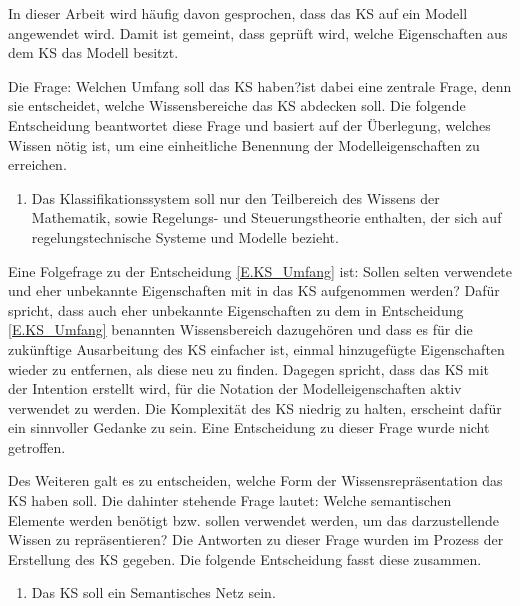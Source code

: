 In dieser Arbeit wird häufig davon gesprochen, dass das KS auf ein Modell angewendet wird. Damit ist gemeint, dass geprüft wird, welche Eigenschaften aus dem KS das Modell besitzt. 

Die Frage: \glqq Welchen Umfang soll das KS haben?\grqq ist dabei eine zentrale Frage, denn sie entscheidet, welche Wissensbereiche das KS abdecken soll. Die folgende Entscheidung beantwortet diese Frage und basiert auf der Überlegung, welches Wissen nötig ist, um eine einheitliche Benennung der Modelleigenschaften zu erreichen. 
\begin{enumerate}[resume*]
	\item \label{E.KS_Umfang}Das Klassifikationssystem soll nur den Teilbereich des Wissens der Mathematik, sowie Regelungs- und Steuerungstheorie enthalten, der sich auf regelungstechnische Systeme und Modelle bezieht.
\end{enumerate}

Eine Folgefrage zu der Entscheidung \ref{E.KS_Umfang} ist: Sollen selten verwendete und eher unbekannte Eigenschaften mit in das KS aufgenommen werden? Dafür spricht, dass auch eher unbekannte Eigenschaften zu dem in Entscheidung \ref{E.KS_Umfang} benannten Wissensbereich dazugehören und dass es für die zukünftige Ausarbeitung des KS einfacher ist, einmal hinzugefügte Eigenschaften wieder zu entfernen, als diese neu zu finden. Dagegen spricht, dass das KS mit der Intention erstellt wird, für die Notation der Modelleigenschaften aktiv verwendet zu werden. Die Komplexität des KS niedrig zu halten, erscheint dafür ein sinnvoller Gedanke zu sein. Eine Entscheidung zu dieser Frage wurde nicht getroffen.

Des Weiteren galt es zu entscheiden, welche Form der Wissensrepräsentation das KS haben soll. Die dahinter stehende Frage lautet: Welche semantischen Elemente werden benötigt bzw. sollen verwendet werden, um das darzustellende Wissen zu repräsentieren? Die Antworten zu dieser Frage wurden im Prozess der Erstellung des KS gegeben. Die folgende Entscheidung fasst diese zusammen.
\begin{enumerate}[resume*]
	\item \label{E.KS_SemantischesNetz}Das KS soll ein Semantisches Netz sein. %
\end{enumerate}

